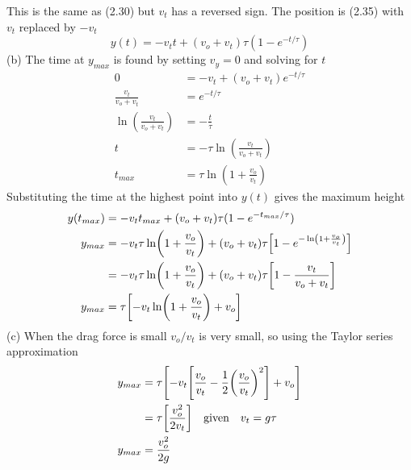 \documentclass[../problems.tex]{subfiles}
\begin{document}
This is the same as (2.30) but $v_t$ has a reversed sign. The position is (2.35) with $v_t$
replaced by $-v_t$
\begin{equation*}
    y(t) = -v_t t + (v_{o} + v_t) \tau (1 - e^{-t/\tau})
\end{equation*}
(b) The time at $y_{max}$ is found by setting $v_y = 0$ and solving for $t$
\begin{align*}
    0 &= -v_t + (v_{o} + v_t)e^{-t/\tau} \\
    \frac{v_t}{v_{o} + v_t} &= e^{-t/\tau} \\
    \ln (\frac{v_t}{v_{o} + v_t}) &= -\frac{t}{\tau} \\
    t &= -\tau \ln (\frac{v_t}{v_{o} + v_t}) \\
    t_{max} &= \tau \ln (1 + \frac{v_{o}}{v_t})
\end{align*}
Substituting the time at the highest point into $y(t)$ gives the maximum height
\begin{align*}
    y(t_{max}) &= -v_t t_{max} + (v_{o} + v_t) \tau (1 - e^{-t_{max}/\tau}) \\
    y_{max} &= -v_t \tau \ln (1 + \frac{v_{o}}{v_t}) + (v_{o} + v_t) \tau 
        \quantity[1 - e^{-\ln (1 + \frac{v_{o}}{v_t})}] \\
    &= -v_t \tau \ln (1 + \frac{v_{o}}{v_t}) + (v_{o} + v_t) \tau 
        \quantity[1 - \frac{v_t}{v_{o} + v_t}] \\
    y_{max} &= \tau \quantity[-v_t \ln (1 + \frac{v_{o}}{v_t}) + v_{o}] 
\end{align*}
(c) When the drag force is small $v_o/v_t$ is very small, so using the Taylor series approximation
\begin{align*}
    y_{max} &= \tau\quantity[-v_t \quantity[\frac{v_o}{v_t} 
        - \frac{1}{2}\quantity(\frac{v_o}{v_t})^2] + v_{o}] \\
    &= \tau\quantity[\frac{v_o^2}{2v_t}] \qgiven{v_t = g\tau} \\ 
    y_{max} &= \frac{v_o^2}{2g}
\end{align*}
\end{document}
